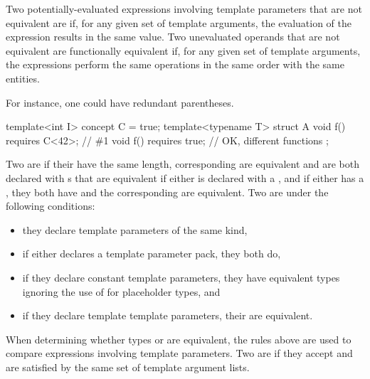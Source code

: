 %
Two potentially-evaluated expressions involving template parameters that are not equivalent are
if, for any given set of template arguments, the evaluation of the
expression results in the same value.
Two unevaluated operands that are not equivalent
are functionally equivalent if, for any given set of template arguments,
the expressions perform
the same operations in the same order with the same entities.
\begin{note}
For instance, one could have redundant parentheses.
\end{note}
\begin{example}
\begin{codeblock}
template<int I> concept C = true;
template<typename T> struct A {
  void f() requires C<42>;      // \#1
  void f() requires true;       // OK, different functions
};
\end{codeblock}
\end{example}

\pnum
Two  are
 if
their  have the same length,
corresponding  are equivalent
and are both declared with s that are equivalent
if either 
is declared with a ,
and if either  has a ,
they both have
 and the corresponding
 are equivalent.
Two  are
under the following conditions:
\begin{itemize}
\item they declare template parameters of the same kind,
\item if either declares a template parameter pack, they both do,
\item if they declare constant template parameters,
they have equivalent types
ignoring the use of  for placeholder types, and
\item if they declare template template parameters,
their  are equivalent.
\end{itemize}
When determining whether types or 
are equivalent, the rules above are used to compare expressions
involving template parameters.
Two  are
if they accept and are satisfied by
the same set of template argument lists.

